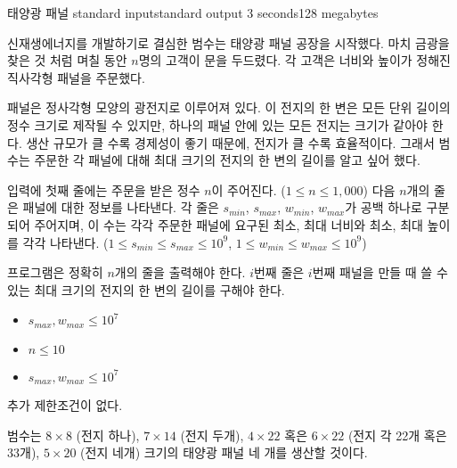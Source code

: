 \begin{problem}{태양광 패널}
	{standard input}{standard output}
	{3 seconds}{128 megabytes}{}
	
	신재생에너지를 개발하기로 결심한 범수는 태양광 패널 공장을 시작했다. 마치 금광을 찾은 것 처럼 며칠 동안 $n$명의 고객이 문을 두드렸다. 각 고객은 너비와 높이가 정해진 직사각형 패널을 주문했다.
	
	패널은 정사각형 모양의 광전지로 이루어져 있다. 이 전지의 한 변은 모든 단위 길이의 정수 크기로 제작될 수 있지만, 하나의 패널 안에 있는 모든 전지는 크기가 같아야 한다. 생산 규모가 클 수록 경제성이 좋기 때문에, 전지가 클 수록 효율적이다. 그래서 범수는 주문한 각 패널에 대해 최대 크기의 전지의 한 변의 길이를 알고 싶어 했다.
	
	\InputFile
	
	입력에 첫째 줄에는 주문을 받은 정수 $n$이 주어진다. ($1 \le n \le 1,000$) 다음 $n$개의 줄은 패널에 대한 정보를 나타낸다. 각 줄은 $s_{min}$, $s_{max}$, $w_{min}$, $w_{max}$가 공백 하나로 구분되어 주어지며, 이 수는 각각 주문한 패널에 요구된 최소, 최대 너비와 최소, 최대 높이를 각각 나타낸다. ($1 \le s_{min} \le s_{max} \le 10^9$, $1 \le w_{min} \le w_{max} \le 10^9$)
	
	
	\OutputFile
	프로그램은 정확히 $n$개의 줄을 출력해야 한다. $i$번째 줄은 $i$번째 패널을 만들 때 쓸 수 있는 최대 크기의 전지의 한 변의 길이를 구해야 한다.
	
	\begin{itemize}
		\item $s_{max} , w_{max} \le 10^7$
		\item $n \le 10$
	\end{itemize}
	\begin{itemize}
		\item $s_{max} , w_{max} \le 10^7$
	\end{itemize}
	
	
	추가 제한조건이 없다.
	
	\Examples
		
	\begin{example}
	\end{example}
	
	\Note
	
	범수는 $8 \times 8$ (전지 하나), $7 \times 14$ (전지 두개), $4 \times 22$ 혹은 $6 \times 22$ (전지 각 22개 혹은 33개), $5 \times 20$ (전지 네개) 크기의 태양광 패널 네 개를 생산할 것이다.
	
\end{problem}

